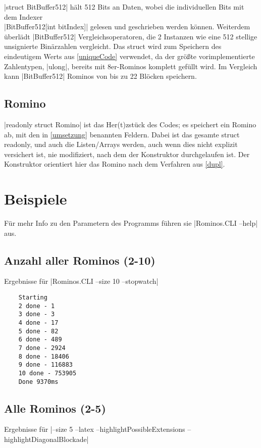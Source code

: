 \documentclass[a4paper,10pt,ngerman]{scrartcl}
\begin{document}
|struct BitBuffer512| hält 512 Bits an Daten,
wobei die individuellen Bits mit dem Indexer\\
|BitBuffer512[int bitIndex]| gelesen und geschrieben
werden können. Weiterdem überlädt |BitBuffer512|
Vergleichsoperatoren, die 2 Instanzen wie eine 512 stellige
unsignierte Binärzahlen vergleicht.
Das struct wird zum Speichern des eindeutigem Werts aus
\cref{uniqueCode} verwendet, da der größte vorimplementierte
Zahlentypen, |ulong|, bereits mit 8er-Rominos komplett
gefüllt wird. Im Vergleich kann |BitBuffer512|
Rominos von bis zu 22 Blöcken speichern.

\subsection{Romino}

|readonly struct Romino| ist das Her(t)zstück des Codes; es speichert ein Romino ab,
mit den in \cref{umsetzung} benannten Feldern. Dabei ist das gesamte struct
readonly, und auch die Listen/Arrays werden, auch wenn dies nicht explizit
versichert ist, nie modifiziert, nach dem der Konstruktor durchgelaufen ist.
Der Konstruktor orientiert hier das Romino nach dem Verfahren aus \cref{dupl}.

\section{Beispiele}

Für mehr Info zu den Parametern des Programms führen sie |Rominos.CLI --help| aus.

\subsection{Anzahl aller Rominos (2-10)}

Ergebnisse für |Rominos.CLI --size 10 --stopwatch|

\begin{lstlisting}
    Starting
    2 done - 1
    3 done - 3
    4 done - 17
    5 done - 82
    6 done - 489
    7 done - 2924
    8 done - 18406
    9 done - 116883
    10 done - 753905
    Done 9370ms
\end{lstlisting}

\subsection{Alle Rominos (2-5)}

Ergebnisse für |--size 5 --latex --highlightPossibleExtensions --highlightDiagonalBlockade|
\end{document}
